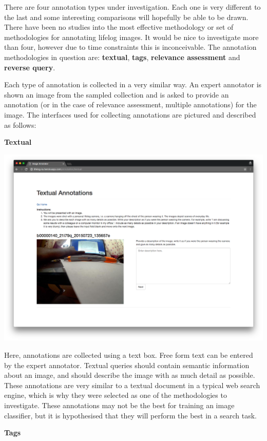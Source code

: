 \documentclass[12pt,a4paper]{article}
\begin{document}
There are four annotation types under investigation. Each one is very different to the last and some interesting comparisons will hopefully be able to be drawn. There have been no studies into the most effective methodology or set of methodologies for annotating lifelog images. It would be nice to investigate more than four, however due to time constraints this is inconceivable. The annotation methodologies in question are: \textbf{textual}, \textbf{tags}, \textbf{relevance assessment} and \textbf{reverse query}. 

Each type of annotation is collected in a very similar way. An expert annotator is shown an image from the sampled collection and is asked to provide an annotation (or in the case of relevance assessment, multiple annotations) for the image. The interfaces used for collecting annotations are pictured and described as follows:

\newpage
\textbf{Textual}

\includegraphics[width=\textwidth]{images/text-interface}

Here, annotations are collected using a text box. Free form text can be entered by the expert annotator. Textual queries should contain semantic information about an image, and should describe the image with as much detail as possible. These annotations are very similar to a textual document in a typical web search engine, which is why they were selected as one of the methodologies to investigate. These annotations may not be the best for training an image classifier, but it is hypothesised that they will perform the best in a search task.

\newpage
\textbf{Tags}
\end{document}
